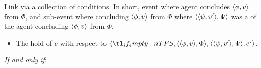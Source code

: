 \begin{note}
  Link via a collection of conditions.
  In short, event where agent concludes \(\langle \phi, v \rangle\) from \(\Phi\), and sub-event where concluding \(\langle \phi, v \rangle\) from \(\Phi\) where \(\langle \langle \psi, v' \rangle, \Psi \rangle\) was a \requ{} of the agent concluding \(\langle \phi, v \rangle\) from \(\Phi\).

  \begin{definition}[\rCon{2}]
    \label{def:rCon}
    \vspace{-\baselineskip}
    \begin{itemize}
    \item
      The \emph{} hold of \(e\) with respect to \(\langle \vAgent{}, \pvp{\phi}{v}{\Phi}, \pvp{\psi}{v'}{\Psi}, e^{\flat} \rangle\).
    \end{itemize}

    \emph{If and only if}:


\end{definition}
\end{note}

